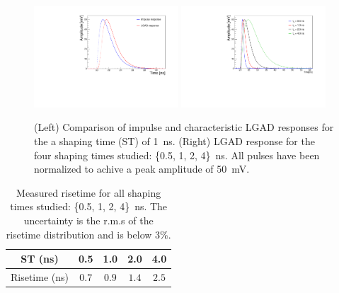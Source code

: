 \documentclass[preprint,1p]{elsarticle}
\begin{document}
\begin{figure}[htbp]
  \centering
  \includegraphics[width=0.48\textwidth]{figs/impulse_vs_lgad_response_1ns_shaping.pdf} \hfill
  \includegraphics[width=0.48\textwidth]{figs/lgad_all_shaping_time_noiseless.pdf}
  \caption{(Left) Comparison of impulse and characteristic LGAD responses for the a shaping time (ST) of 1~\si{ns}.
  (Right) LGAD response for the four shaping times studied: \{0.5, 1, 2, 4\}~\si{ns}. All pulses have been normalized
  to achive a peak amplitude of 50~\si{mV}. }
  \label{fig:ir_and_lgad}
\end{figure}


\begin{table}
  \begin{center}
    \begin{tabular}{c|cccc}
    ST (ns) & 0.5  & 1.0 & 2.0 & 4.0 \\\hline
    Risetime (ns) & $0.7$ & $0.9$ & $1.4$ & $2.5$ \\
    \end{tabular}
    \caption{Measured risetime for all shaping times studied: \{0.5, 1, 2, 4\}~\si{ns}. The uncertainty is the r.m.s of the
    risetime distribution and is below 3\%.}
    \label{tab:risetime}
  \end{center}
 \end{table}
\end{document}
